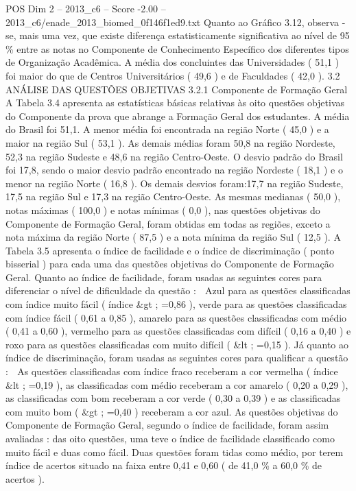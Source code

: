 \begin{textsample}{POS Dim 2 – 2013\_c6 – Score -2.00 – 2013\_c6/enade\_2013\_biomed\_0f146f1ed9.txt}
Quanto ao Gráfico 3.12, observa -se, mais uma vez, que existe diferença estatisticamente significativa ao nível de 95 \% entre as notas no Componente de Conhecimento Específico dos diferentes tipos de Organização Acadêmica.
A média dos concluintes das Universidades ( 51,1 ) foi maior do que de Centros Universitários ( 49,6 ) e de Faculdades ( 42,0 ). 3.2 ANÁLISE DAS QUESTÕES OBJETIVAS 3.2.1 Componente de Formação Geral A Tabela 3.4 apresenta as estatísticas básicas relativas às oito questões objetivas do Componente da prova que abrange a Formação Geral dos estudantes.
A média do Brasil foi 51,1.
A menor média foi encontrada na região Norte ( 45,0 ) e a maior na região Sul ( 53,1 ).
As demais médias foram 50,8 na região Nordeste, 52,3 na região Sudeste e 48,6 na região Centro-Oeste.
O desvio padrão do Brasil foi 17,8, sendo o maior desvio padrão encontrado na região Nordeste ( 18,1 ) e o menor na região Norte ( 16,8 ).
Os demais desvios foram:17,7 na região Sudeste, 17,5 na região Sul e 17,3 na região Centro-Oeste.
As mesmas medianas ( 50,0 ), notas máximas ( 100,0 ) e notas mínimas ( 0,0 ), nas questões objetivas do Componente de Formação Geral, foram obtidas em todas as regiões, exceto a nota máxima da região Norte ( 87,5 ) e a nota mínima da região Sul ( 12,5 ).
A Tabela 3.5 apresenta o índice de facilidade e o índice de discriminação ( ponto bisserial ) para cada uma das questões objetivas do Componente de Formação Geral.
Quanto ao índice de facilidade, foram usadas as seguintes cores para diferenciar o nível de dificuldade da questão :  Azul para as questões classificadas com índice muito fácil ( índice \&gt ; =0,86 ), verde para as questões classificadas com índice fácil ( 0,61 a 0,85 ), amarelo para as questões classificadas com médio ( 0,41 a 0,60 ), vermelho para as questões classificadas com difícil ( 0,16 a 0,40 ) e roxo para as questões classificadas com muito difícil ( \&lt ; =0,15 ).
Já quanto ao índice de discriminação, foram usadas as seguintes cores para qualificar a questão :  As questões classificadas com índice fraco receberam a cor vermelha ( índice \&lt ; =0,19 ), as classificadas com médio receberam a cor amarelo ( 0,20 a 0,29 ), as classificadas com bom receberam a cor verde ( 0,30 a 0,39 ) e as classificadas com muito bom ( \&gt ; =0,40 ) receberam a cor azul.
As questões objetivas do Componente de Formação Geral, segundo o índice de facilidade, foram assim avaliadas : das oito questões, uma teve o índice de facilidade classificado como muito fácil e duas como fácil.
Duas questões foram tidas como médio, por terem índice de acertos situado na faixa entre 0,41 e 0,60 ( de 41,0 \% a 60,0 \% de acertos ).

\end{textsample}

